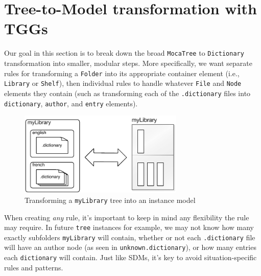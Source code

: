 \newpage
\section{Tree-to-Model transformation with TGGs}
\genHeader

Our goal in this section is to break down the broad \texttt{MocaTree} to \texttt{Dictionary} transformation into smaller, modular steps. More specifically, we
want separate rules for transforming a \texttt{Folder} into its appropriate container element (i.e., \texttt{Library} or \texttt{Shelf}), then individual rules
to handle whatever \texttt{File} and \texttt{Node} elements they contain (such as transforming each of the \texttt{.dictionary} files into
\texttt{dictionary}, \texttt{author}, and \texttt{entry} elements).

\vspace{0.5cm}

\begin{figure}[htp]
\begin{center}
  \includegraphics[width=0.7\textwidth]{goal}
  \caption{Transforming a \texttt{myLibrary} tree into an instance model}
  \label{fig:treeToDictionary}
\end{center}
\end{figure}

\vspace{0.5cm}

When creating \emph{any} rule, it's important to keep in mind any flexibility the rule may require. In future \texttt{tree} instances for example, we
may not know how many exactly subfolders \texttt{myLibrary} will contain, whether or not each \texttt{.dictionary} file will have an author node (as seen in
\texttt{unknown.dictionary}), or how many entries each \texttt{dictionary} will contain. Just like SDMs, it's key to avoid situation-specific rules and
patterns.







